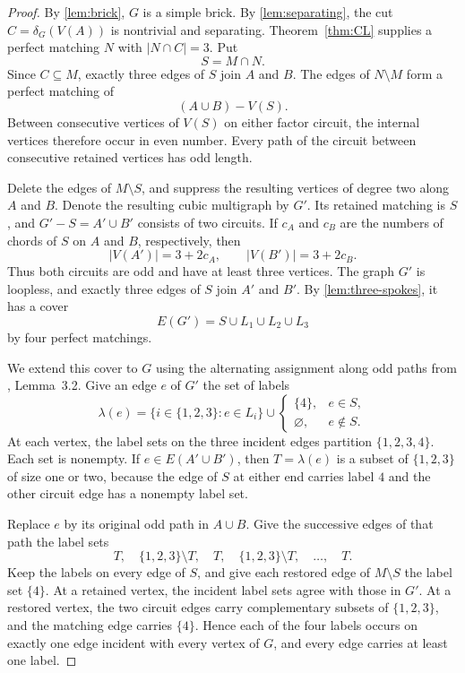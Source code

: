 \documentclass[justified,notoc,twoside,nobib,nofonts]{tufte-handout}
\newcommand{\three}{\{1,2,3\}}
\begin{document}
\fourmatchings*
\begin{proof}
By \cref{lem:brick}, $G$ is a simple brick. By
\cref{lem:separating}, the cut $C=\delta_G(V(A))$ is nontrivial and
separating. Theorem~\ref{thm:CL} supplies a perfect matching $N$ with
$|N\cap C|=3$. Put
\[
  S=M\cap N.
\]
Since $C\subseteq M$, exactly three edges of $S$ join $A$ and $B$.
The edges of $N\setminus M$ form a perfect matching of
\[
  (A\cup B)-V(S).
\]
Between consecutive vertices of $V(S)$ on either factor circuit,
the internal vertices therefore occur in even number. Every path
of the circuit between consecutive retained vertices has odd length.

Delete the edges of $M\setminus S$, and suppress the resulting vertices
of degree two along $A$ and $B$. Denote the resulting cubic multigraph
by $G'$. Its retained matching is $S$, and $G'-S=A'\cup B'$ consists
of two circuits. If $c_A$ and $c_B$ are the numbers of chords of $S$
on $A$ and $B$, respectively, then
\[
  |V(A')|=3+2c_A,\qquad |V(B')|=3+2c_B.
\]
Thus both circuits are odd and have at least three vertices. The graph
$G'$ is loopless, and exactly three edges of $S$ join $A'$ and $B'$.
By \cref{lem:three-spokes}, it has a cover
\[
  E(G')=S\cup L_1\cup L_2\cup L_3
\]
by four perfect matchings.

We extend this cover to $G$ using the alternating assignment along
odd paths from \citep{KM26}, Lemma~3.2. Give an edge $e$ of $G'$ the
set of labels
\[
  \lambda(e)=\{i\in\three:e\in L_i\}
       \cup\begin{cases}\{4\},&e\in S,\\ \varnothing,&e\notin S.\end{cases}
\]
At each vertex, the label sets on the three incident edges partition
$\{1,2,3,4\}$. Each set is nonempty. If $e\in E(A'\cup B')$, then
$T=\lambda(e)$ is a subset of $\three$ of size one or two, because
the edge of $S$ at either end carries label $4$ and the other circuit
edge has a nonempty label set.

Replace $e$ by its original odd path in $A\cup B$. Give the successive
edges of that path the label sets
\begin{equation}\label{eq:extension}
  T,\quad \three\setminus T,\quad T,\quad
  \three\setminus T,\quad\ldots,\quad T.
\end{equation}
Keep the labels on every edge of $S$, and give each restored edge of
$M\setminus S$ the label set $\{4\}$.
At a retained vertex, the incident label sets agree with those in
$G'$. At a restored vertex, the two circuit edges carry complementary
subsets of $\three$, and the matching edge carries $\{4\}$.
Hence each of the four labels occurs on exactly one edge incident
with every vertex of $G$, and every edge carries at least one label.


\end{proof}
\end{document}
